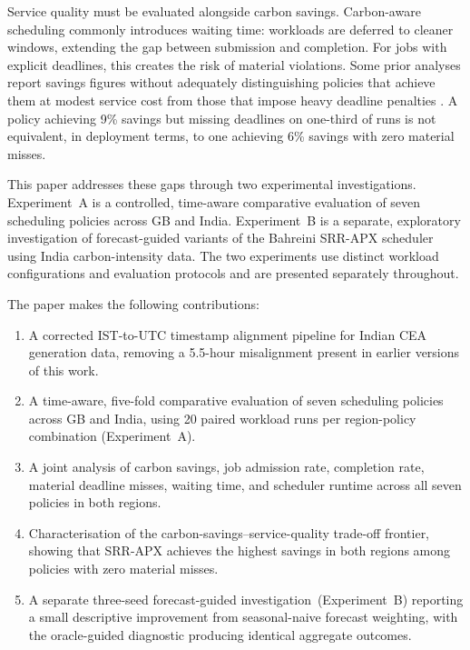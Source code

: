 \documentclass[conference]{IEEEtran}
\begin{document}
Service quality must be evaluated alongside carbon savings. Carbon-aware
scheduling commonly introduces waiting time: workloads are deferred to cleaner
windows, extending the gap between submission and completion. For jobs with
explicit deadlines, this creates the risk of material violations. Some prior
analyses report savings figures without adequately distinguishing policies that
achieve them at modest service cost from those that impose heavy deadline
penalties \cite{hanafy2024gaia,bahreini2022approx}. A policy achieving 9\%
savings but missing deadlines on one-third of runs is not equivalent, in
deployment terms, to one achieving 6\% savings with zero material misses.

This paper addresses these gaps through two experimental investigations.
Experiment~A is a controlled, time-aware comparative evaluation of seven
scheduling policies across GB and India. Experiment~B is a separate,
exploratory investigation of forecast-guided variants of the Bahreini SRR-APX
scheduler using India carbon-intensity data. The two experiments use distinct
workload configurations and evaluation protocols and are presented separately
throughout.

The paper makes the following contributions:

\begin{enumerate}
  \item A corrected IST-to-UTC timestamp alignment pipeline for Indian CEA
        generation data, removing a 5.5-hour misalignment present in earlier
        versions of this work.
  \item A time-aware, five-fold comparative evaluation of seven scheduling
        policies across GB and India, using 20 paired workload runs per
        region-policy combination (Experiment~A).
  \item A joint analysis of carbon savings, job admission rate, completion
        rate, material deadline misses, waiting time, and scheduler runtime
        across all seven policies in both regions.
  \item Characterisation of the carbon-savings--service-quality trade-off
        frontier, showing that SRR-APX achieves the highest savings in both
        regions among policies with zero material misses.
  \item A separate three-seed forecast-guided investigation~(Experiment~B)
        reporting a small descriptive improvement from seasonal-naive forecast
        weighting, with the oracle-guided diagnostic producing identical
        aggregate outcomes.
\end{enumerate}
\end{document}

